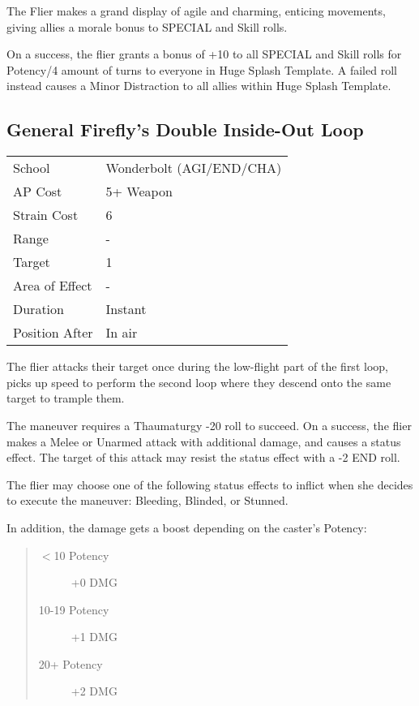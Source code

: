 \documentclass[11pt,a4paper,twocolumn]{book}
\begin{document}
\medskip

The Flier makes a grand display of agile and charming, enticing movements, giving allies a morale bonus to SPECIAL and Skill rolls.

On a success, the flier grants a bonus of +10 to all SPECIAL and Skill rolls for Potency/4 amount of turns to everyone in Huge Splash Template. A failed roll instead causes a Minor Distraction to all allies within Huge Splash Template.

\vfill

\subsection*{General Firefly's Double Inside-Out Loop}
{
	\begin{tabu} to 75mm{| X[l,4] | X[l,7] |}
		\hline
		School 			& Wonderbolt (AGI/END/CHA) 		\\
		AP Cost	      	& 5+ Weapon		    \\
		Strain Cost     & 6 				\\
		Range     		& - 				\\
		Target      	& 1 				\\
		Area of Effect  & - 	 			\\
		Duration     	& Instant 	 		\\
		Position After  & In air 			\\ \hline
	\end{tabu}
	
}

\medskip

The flier attacks their target once during the low-flight part of the first loop, picks up speed to perform the second loop where they descend onto the same target to trample them.

The maneuver requires a Thaumaturgy -20 roll to succeed. On a success, the flier makes a Melee or Unarmed attack with additional damage, and causes a status effect. The target of this attack may resist the status effect with a -2 END roll.

The flier may choose one of the following status effects to inflict when she decides to execute the maneuver: Bleeding, Blinded, or Stunned.

In addition, the damage gets a boost depending on the caster's Potency:
\begin{quote}
	\begin{description}
		\item[$<$10 Potency] 	+0 DMG
		\item[10-19 Potency] 	+1 DMG
		\item[20+ Potency] 	    +2 DMG
	\end{description}
\end{quote}
\end{document}
